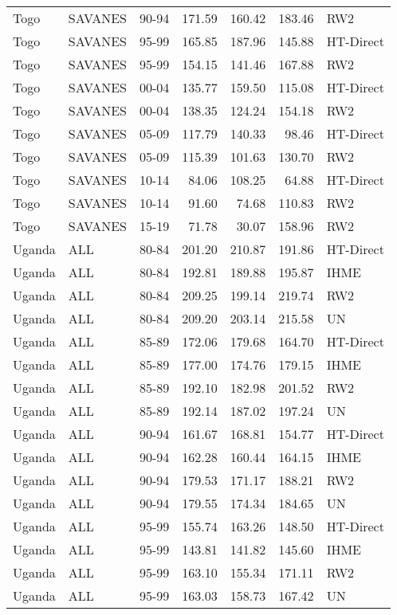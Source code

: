 \begin{longtable}{lllrrrl}
  Togo & SAVANES & 90-94 & 171.59 & 160.42 & 183.46 & RW2 \\ 
  Togo & SAVANES & 95-99 & 165.85 & 187.96 & 145.88 & HT-Direct \\ 
  Togo & SAVANES & 95-99 & 154.15 & 141.46 & 167.88 & RW2 \\ 
  Togo & SAVANES & 00-04 & 135.77 & 159.50 & 115.08 & HT-Direct \\ 
  Togo & SAVANES & 00-04 & 138.35 & 124.24 & 154.18 & RW2 \\ 
  Togo & SAVANES & 05-09 & 117.79 & 140.33 & 98.46 & HT-Direct \\ 
  Togo & SAVANES & 05-09 & 115.39 & 101.63 & 130.70 & RW2 \\ 
  Togo & SAVANES & 10-14 & 84.06 & 108.25 & 64.88 & HT-Direct \\ 
  Togo & SAVANES & 10-14 & 91.60 & 74.68 & 110.83 & RW2 \\ 
  Togo & SAVANES & 15-19 & 71.78 & 30.07 & 158.96 & RW2 \\ 
  Uganda & ALL & 80-84 & 201.20 & 210.87 & 191.86 & HT-Direct \\ 
  Uganda & ALL & 80-84 & 192.81 & 189.88 & 195.87 & IHME \\ 
  Uganda & ALL & 80-84 & 209.25 & 199.14 & 219.74 & RW2 \\ 
  Uganda & ALL & 80-84 & 209.20 & 203.14 & 215.58 & UN \\ 
  Uganda & ALL & 85-89 & 172.06 & 179.68 & 164.70 & HT-Direct \\ 
  Uganda & ALL & 85-89 & 177.00 & 174.76 & 179.15 & IHME \\ 
  Uganda & ALL & 85-89 & 192.10 & 182.98 & 201.52 & RW2 \\ 
  Uganda & ALL & 85-89 & 192.14 & 187.02 & 197.24 & UN \\ 
  Uganda & ALL & 90-94 & 161.67 & 168.81 & 154.77 & HT-Direct \\ 
  Uganda & ALL & 90-94 & 162.28 & 160.44 & 164.15 & IHME \\ 
  Uganda & ALL & 90-94 & 179.53 & 171.17 & 188.21 & RW2 \\ 
  Uganda & ALL & 90-94 & 179.55 & 174.34 & 184.65 & UN \\ 
  Uganda & ALL & 95-99 & 155.74 & 163.26 & 148.50 & HT-Direct \\ 
  Uganda & ALL & 95-99 & 143.81 & 141.82 & 145.60 & IHME \\ 
  Uganda & ALL & 95-99 & 163.10 & 155.34 & 171.11 & RW2 \\ 
  Uganda & ALL & 95-99 & 163.03 & 158.73 & 167.42 & UN \\ 

\end{longtable}
